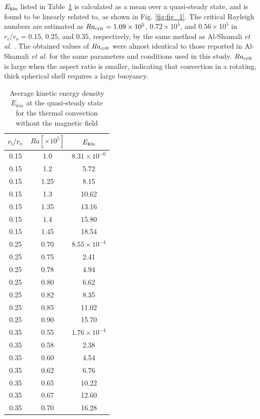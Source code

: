 $E_{\rm kin}$ listed in Table~\ref{table:Rac} is calculated as a mean over a quasi-steady state, and is found to be linearly related to, as shown in Fig. \ref{fig:fig_1}.
The critical Rayleigh numbers are estimated as $Ra_{\rm crit} = 1.09 \times 10^5$, $0.72 \times 10^5$, and $0.56 \times 10^5$ in $r_i/r_o = 0.15$, $0.25$, and $0.35$, respectively, by the same method as Al-Shamali {\it et al.} . 
The obtained values of $Ra_{\rm crit}$ were almost identical to those reported in Al-Shamali {\it et al.}  for the same parameters and conditions used in this study. 
$Ra_{\rm crit}$ is large when the aspect ratio is smaller, indicating that convection in a rotating, thick spherical shell requires a large buoyancy.
%
%
\begin{table}
\caption{Average kinetic energy density $E_{kin}$ at the quasi-steady state \\
for the thermal convection without the magnetic field}
\begin{center}
\begin{tabular}{|ccc||}
   \hline
  $r_{\rm i}/r_{\rm o}$ & $Ra[\times 10^5] $ &  $E_{\rm kin}$ \\
    \hline \hline
 0.15  &  1.0  &  $8.31 \times 10^{-6}$ \\
 0.15  &  1.2  &  5.72 \\
 0.15  &  1.25 &  8.15 \\
 0.15  &  1.3  &  10.62 \\
 0.15  &  1.35 &  13.16 \\
 0.15  &  1.4  &  15.80 \\
 0.15  &  1.45  &  18.54 \\
 \hline
%
 0.25  &  0.70 &  $8.55 \times 10^{-4}$ \\
 0.25  &  0.75 &  2.41 \\
 0.25  &  0.78  &  4.94 \\
 0.25  &  0.80  &  6.62 \\
 0.25  &  0.82  & 8.35 \\
 0.25  &  0.85  &  11.02 \\
 0.25  &  0.90  &  15.70 \\
 \hline
%
 0.35  &  0.55  &  $1.76 \times 10^{-4}$ \\
 0.35  &  0.58  &  2.38  \\
 0.35  &  0.60  &  4.54  \\
 0.35  &  0.62  &  6.76 \\
 0.35  &  0.65  &  10.22 \\
 0.35  &  0.67  &  12.60\\
 0.35  &  0.70  &  16.28 \\
 \hline
 \hline
\end{tabular}
\end{center}
\label{table:Rac}
\end{table}
%
